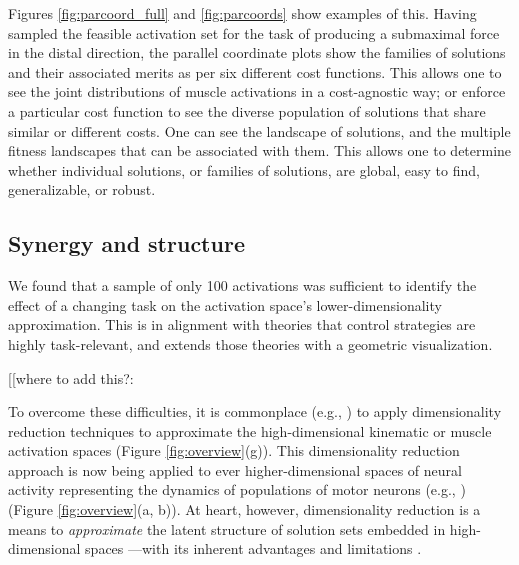 \documentclass[10pt,letterpaper]{article}
\begin{document}
Figures \ref{fig:parcoord_full} and \ref{fig:parcoords} show examples of this. Having sampled the feasible activation set for the task of producing a submaximal force in the distal direction, the parallel coordinate plots show the families of solutions and their associated merits as per six different cost functions.  This allows one to see the joint distributions of muscle activations in  a cost-agnostic way; or enforce a particular cost function to see the diverse population of solutions that share similar or different costs. One can see  the landscape of solutions, and the multiple fitness landscapes that can be associated with them. This allows one to determine whether individual solutions, or families of solutions, are global, easy to find, generalizable, or robust.

\subsection*{Synergy and structure}
We found that a sample of only 100 activations was sufficient to identify the effect of a changing task on the activation space's lower-dimensionality approximation. This is in alignment with theories that control strategies are highly task-relevant, and extends those theories with a geometric visualization.


[[where to add this?:

To overcome these difficulties, it is commonplace (e.g., \cite{Frontiers2012Modularity,Clewley2008Estimating}) to apply dimensionality reduction techniques to approximate the high-dimensional kinematic or muscle activation spaces \cite{scholz1999uncontrolled, krishnamoorthy2003muscle,santello1998postural} (Figure \ref{fig:overview}(g)).
This dimensionality reduction approach is now being applied to ever higher-dimensional spaces of neural activity representing the dynamics of  populations of motor neurons (e.g., \cite{churchland2012neural,sadtler2014neural}) (Figure \ref{fig:overview}(a, b)). At heart, however, dimensionality reduction is a means to \emph{approximate} the latent structure of solution sets embedded in high-dimensional spaces \cite{valero-cuevas2015fundamentals}---with its inherent advantages and limitations \cite{Clewley2008Estimating}.
\end{document}
